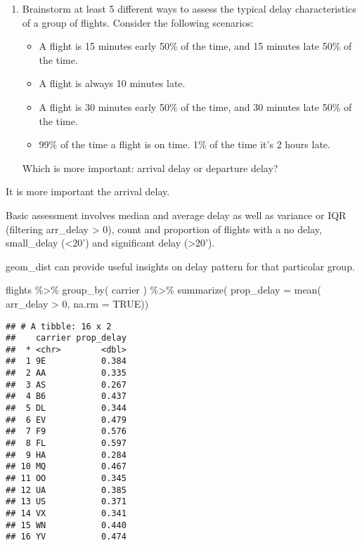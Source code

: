 \documentclass[
]{article}
\newenvironment{Shaded}{\begin{snugshade}}{\end{snugshade}}
\newcommand{\AttributeTok}[1]{\textcolor[rgb]{0.77,0.63,0.00}{#1}}
\newcommand{\ConstantTok}[1]{\textcolor[rgb]{0.00,0.00,0.00}{#1}}
\newcommand{\DecValTok}[1]{\textcolor[rgb]{0.00,0.00,0.81}{#1}}
\newcommand{\FunctionTok}[1]{\textcolor[rgb]{0.00,0.00,0.00}{#1}}
\newcommand{\NormalTok}[1]{#1}
\newcommand{\SpecialCharTok}[1]{\textcolor[rgb]{0.00,0.00,0.00}{#1}}
\begin{document}
\begin{enumerate}
\def\labelenumi{\arabic{enumi}.}
\item
  Brainstorm at least 5 different ways to assess the typical delay
  characteristics of a group of flights. Consider the following
  scenarios:

  \begin{itemize}
  \item
    A flight is 15 minutes early 50\% of the time, and 15 minutes late
    50\% of the time.
  \item
    A flight is always 10 minutes late.
  \item
    A flight is 30 minutes early 50\% of the time, and 30 minutes late
    50\% of the time.
  \item
    99\% of the time a flight is on time. 1\% of the time it's 2 hours
    late.
  \end{itemize}

  Which is more important: arrival delay or departure delay?
\end{enumerate}

It is more important the arrival delay.

Basic assessment involves median and average delay as well as variance
or IQR (filtering arr\_delay \textgreater{} 0), count and proportion of
flights with a no delay, small\_delay (\textless20') and significant
delay (\textgreater20').

geom\_dist can provide useful insights on delay pattern for that
particolar group.

\begin{Shaded}
\begin{Highlighting}[]
\NormalTok{flights }\SpecialCharTok{\%\textgreater{}\%}
  \FunctionTok{group\_by}\NormalTok{( carrier ) }\SpecialCharTok{\%\textgreater{}\%}
  \FunctionTok{summarize}\NormalTok{( }\AttributeTok{prop\_delay =} \FunctionTok{mean}\NormalTok{( arr\_delay }\SpecialCharTok{\textgreater{}} \DecValTok{0}\NormalTok{, }\AttributeTok{na.rm =} \ConstantTok{TRUE}\NormalTok{)) }
\end{Highlighting}
\end{Shaded}

\begin{verbatim}
## # A tibble: 16 x 2
##    carrier prop_delay
##  * <chr>        <dbl>
##  1 9E           0.384
##  2 AA           0.335
##  3 AS           0.267
##  4 B6           0.437
##  5 DL           0.344
##  6 EV           0.479
##  7 F9           0.576
##  8 FL           0.597
##  9 HA           0.284
## 10 MQ           0.467
## 11 OO           0.345
## 12 UA           0.385
## 13 US           0.371
## 14 VX           0.341
## 15 WN           0.440
## 16 YV           0.474
\end{verbatim}
\end{document}

